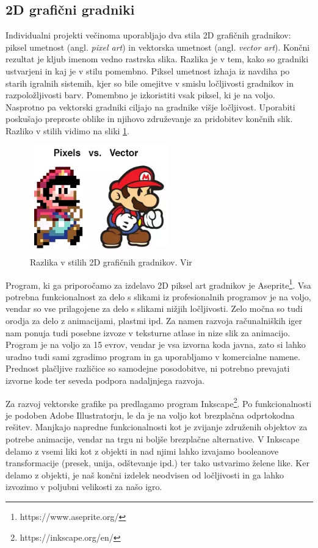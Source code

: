 \documentclass[12pt,a4paper,twoside]{book}
\begin{document}
\subsection{2D grafični gradniki}
Individualni projekti večinoma uporabljajo dva stila 2D grafičnih gradnikov: piksel umetnost (angl. \textit{pixel art}) in vektorska umetnost (angl. \textit{vector art}). Končni rezultat je kljub imenom vedno rastrska slika. Razlika je v tem, kako so gradniki ustvarjeni in kaj je v stilu pomembno. Piksel umetnost izhaja iz navdiha po starih igralnih sistemih, kjer so bile omejitve v smislu ločljivosti gradnikov in razpoložljivosti barv. Pomembno je izkoristiti vsak piksel, ki je na voljo. Nasprotno pa vektorski gradniki ciljajo na gradnike višje ločljivost. Uporabiti poskušajo preproste oblike in njihovo združevanje za pridobitev končnih slik. Razliko v stilih vidimo na sliki \ref{slika:pixelVsVector}.

\begin{figure}[h]
	\centering
	\includegraphics[width=6cm]{pixelVsVector}
	\caption{Razlika v stilih 2D grafičnih gradnikov. Vir \cite{pixelVsVector}}
	\label{slika:pixelVsVector}
\end{figure}

Program, ki ga priporočamo za izdelavo 2D piksel art gradnikov je Aseprite\footnote{https://www.aseprite.org/}. Vsa potrebna funkcionalnost za delo s slikami iz profesionalnih programov je na voljo, vendar so vse prilagojene za delo s slikami nižjih ločljivosti. Zelo močna so tudi orodja za delo z animacijami, plastmi ipd. Za namen razvoja računalniških iger nam ponuja tudi posebne izvoze v teksturne atlase in nize slik za animacijo. Program je na voljo za 15 evrov, vendar je vsa izvorna koda javna, zato si lahko uradno tudi sami zgradimo program in ga uporabljamo v komercialne namene. Prednost plačljive različice so samodejne posodobitve, ni potrebno prevajati izvorne kode ter seveda podpora nadaljnjega razvoja.

Za razvoj vektorske grafike pa predlagamo program Inkscape\footnote{https://inkscape.org/en/}. Po funkcionalnosti je podoben Adobe Illustratorju, le da je na voljo kot brezplačna odprtokodna rešitev. Manjkajo napredne funkcionalnosti kot je zvijanje združenih objektov za potrebe animacije, vendar na trgu ni boljše brezplačne alternative. V Inkscape delamo z vsemi liki kot z objekti in nad njimi lahko izvajamo booleanove transformacije (presek, unija, odštevanje ipd.) ter tako ustvarimo želene like. Ker delamo z objekti, je naš končni izdelek neodvisen od ločljivosti in ga lahko izvozimo v poljubni velikosti za našo igro. 
\end{document}
